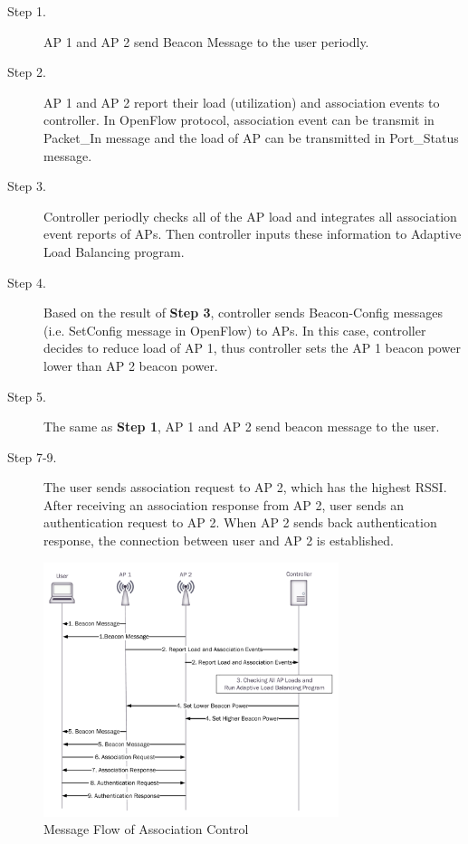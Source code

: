 \begin{description}
  \item [Step 1.] AP 1 and AP 2 send Beacon Message to the user periodly.
  \item [Step 2.] AP 1 and AP 2 report their load (utilization) and association events to controller. In OpenFlow protocol, association event can be transmit in Packet\_In message and the load of AP can be transmitted in Port\_Status message.
  \item [Step 3.] Controller periodly checks all of the AP load and integrates all association event reports of APs. Then controller inputs these information to Adaptive Load Balancing program.
  \item [Step 4.] Based on the result of \textbf{Step 3}, controller sends Beacon-Config messages (i.e. SetConfig message in OpenFlow) to APs. In this case, controller decides to reduce load of AP 1, thus controller sets the AP 1 beacon power lower than AP 2 beacon power.
  \item [Step 5.] The same as \textbf{Step 1}, AP 1 and AP 2 send beacon message to the user.
  \item [Step 7-9.] The user sends association request to AP 2, which has the highest RSSI. After receiving an association response from AP 2, user sends an authentication request to AP 2. When AP 2 sends back authentication response, the connection between user and AP 2 is established.
\end{description}

\begin{figure}[tbp]
\begin{center}
\includegraphics[width=3.4in]{images/flowchart_Cell_Breathing.pdf}
\end{center}
\caption{Message Flow of Association Control}
\label{fig:flowchart_Cell_Breathing}
\end{figure}



